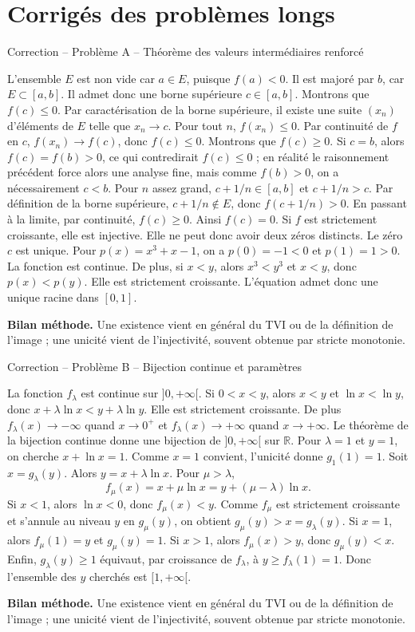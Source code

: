 \documentclass[11pt,a4paper]{article}
\newcommand{\R}{\mathbb{R}}
\begin{document}
\section{Corrigés des problèmes longs}
\begin{corrbox}{Correction -- Problème A -- Théorème des valeurs intermédiaires renforcé}

L'ensemble $E$ est non vide car $a\in E$, puisque $f(a)<0$. Il est majoré par $b$, car $E\subset[a,b]$. Il admet donc une borne supérieure $c\in[a,b]$.
Montrons que $f(c)\leq0$. Par caractérisation de la borne supérieure, il existe une suite $(x_n)$ d'éléments de $E$ telle que $x_n\to c$. Pour tout $n$, $f(x_n)\leq0$. Par continuité de $f$ en $c$, $f(x_n)\to f(c)$, donc $f(c)\leq0$.
Montrons que $f(c)\geq0$. Si $c=b$, alors $f(c)=f(b)>0$, ce qui contredirait $f(c)\leq0$ ; en réalité le raisonnement précédent force alors une analyse fine, mais comme $f(b)>0$, on a nécessairement $c<b$. Pour $n$ assez grand, $c+1/n\in[a,b]$ et $c+1/n>c$. Par définition de la borne supérieure, $c+1/n\notin E$, donc $f(c+1/n)>0$. En passant à la limite, par continuité, $f(c)\geq0$. Ainsi $f(c)=0$.
Si $f$ est strictement croissante, elle est injective. Elle ne peut donc avoir deux zéros distincts. Le zéro $c$ est unique.
Pour $p(x)=x^3+x-1$, on a $p(0)=-1<0$ et $p(1)=1>0$. La fonction est continue. De plus, si $x<y$, alors $x^3<y^3$ et $x<y$, donc $p(x)<p(y)$. Elle est strictement croissante. L'équation admet donc une unique racine dans $[0,1]$.

\medskip
\textbf{Bilan méthode.} Une existence vient en général du TVI ou de la définition de l'image ; une unicité vient de l'injectivité, souvent obtenue par stricte monotonie.
\end{corrbox}
\begin{corrbox}{Correction -- Problème B -- Bijection continue et paramètres}

La fonction $f_\lambda$ est continue sur $]0,+\infty[$. Si $0<x<y$, alors $x<y$ et $\ln x<\ln y$, donc $x+\lambda\ln x<y+\lambda\ln y$. Elle est strictement croissante. De plus $f_\lambda(x)\to-\infty$ quand $x\to0^+$ et $f_\lambda(x)\to+\infty$ quand $x\to+\infty$. Le théorème de la bijection continue donne une bijection de $]0,+\infty[$ sur $\R$.
Pour $\lambda=1$ et $y=1$, on cherche $x+\ln x=1$. Comme $x=1$ convient, l'unicité donne $g_1(1)=1$.
Soit $x=g_\lambda(y)$. Alors $y=x+\lambda\ln x$. Pour $\mu>\lambda$,
\[
f_\mu(x)=x+\mu\ln x=y+(\mu-\lambda)\ln x.
\]
Si $x<1$, alors $\ln x<0$, donc $f_\mu(x)<y$. Comme $f_\mu$ est strictement croissante et s'annule au niveau $y$ en $g_\mu(y)$, on obtient $g_\mu(y)>x=g_\lambda(y)$. Si $x=1$, alors $f_\mu(1)=y$ et $g_\mu(y)=1$. Si $x>1$, alors $f_\mu(x)>y$, donc $g_\mu(y)<x$.
Enfin, $g_\lambda(y)\geq1$ équivaut, par croissance de $f_\lambda$, à $y\geq f_\lambda(1)=1$. Donc l'ensemble des $y$ cherchés est $[1,+\infty[$.

\medskip
\textbf{Bilan méthode.} Une existence vient en général du TVI ou de la définition de l'image ; une unicité vient de l'injectivité, souvent obtenue par stricte monotonie.
\end{corrbox}
\end{document}
